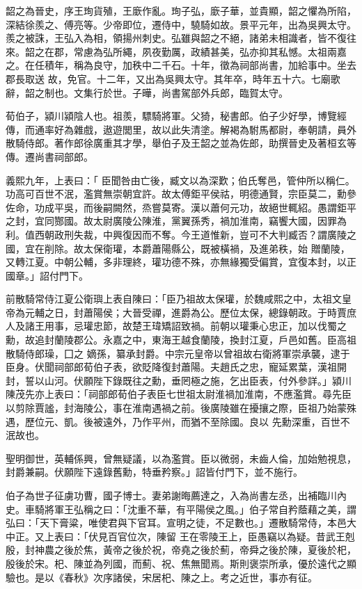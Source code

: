 \begin{pinyinscope}
 韶之為晉史，序王珣貨殖，王廞作亂。珣子弘，廞子華，並貴顯，韶之懼為所陷，深結徐羨之、傅亮等。少帝即位，遷侍中，驍騎如故。景平元年，出為吳興太守。羨之被誅，王弘入為相，領揚州刺史。弘雖與韶之不絕，諸弟未相識者，皆不復往來。韶之在郡，常慮為弘所繩，夙夜勤厲，政績甚美，弘亦抑其私憾。太祖兩嘉之。在任積年，稱為良守，加秩中二千石。十年，徵為祠部尚書，加給事中。坐去郡長取送
 故，免官。十二年，又出為吳興太守。其年卒，時年五十六。七廟歌辭，韶之制也。文集行於世。子曄，尚書駕部外兵郎，臨賀太守。



 荀伯子，潁川潁陰人也。祖羨，驃騎將軍。父猗，秘書郎。伯子少好學，博覽經傳，而通率好為雜戲，遨遊閭里，故以此失清塗。解褐為駙馬都尉，奉朝請，員外散騎侍郎。著作郎徐廣重其才學，舉伯子及王韶之並為佐郎，助撰晉史及著桓玄等傳。遷尚書祠部郎。



 義熙九年，上表曰：「
 臣聞咎由亡後，臧文以為深歎；伯氏奪邑，管仲所以稱仁。功高可百世不泯，濫賞無崇朝宜許。故太傅鉅平侯祜，明德通賢，宗臣莫二，勳參佐命，功成平吳，而後嗣闕然，烝嘗莫寄。漢以蕭何元功，故絕世輒紹。愚謂鉅平之封，宜同酂國。故太尉廣陵公陳淮，黨翼孫秀，禍加淮南，竊饗大國，因罪為利。值西朝政刑失裁，中興復因而不奪。今王道惟新，豈可不大判臧否？謂廣陵之國，宜在削除。故太保衛瓘，本爵蕭陽縣公，既被橫禍，及進弟秩，始
 贈蘭陵，又轉江夏。中朝公輔，多非理終，瓘功德不殊，亦無緣獨受偏賞，宜復本封，以正國章。」詔付門下。



 前散騎常侍江夏公衛璵上表自陳曰：「臣乃祖故太保瓘，於魏咸熙之中，太祖文皇帝為元輔之日，封蕭陽侯；大晉受禪，進爵為公。歷位太保，總錄朝政。于時賈庶人及諸王用事，忌瓘忠節，故楚王瑋矯詔致禍。前朝以瓘秉心忠正，加以伐蜀之勳，故追封蘭陵郡公。永嘉之中，東海王越食蘭陵，換封江夏，戶邑如舊。臣高祖散騎侍郎璪，囗之
 嫡孫，纂承封爵。中宗元皇帝以曾祖故右衛將軍崇承襲，逮于臣身。伏聞祠部郎荀伯子表，欲貶降復封蕭陽。夫趙氏之忠，寵延累葉，漢祖開封，誓以山河。伏願陛下錄既往之勳，垂罔極之施，乞出臣表，付外參詳。」潁川陳茂先亦上表曰：「祠部郎荀伯子表臣七世祖太尉淮禍加淮南，不應濫賞。尋先臣以剪除賈謐，封海陵公，事在淮南遇禍之前。後廣陵雖在擾攘之際，臣祖乃始蒙殊遇，歷位元、凱。後被遠外，乃作平州，而猶不至除國。良以
 先勳深重，百世不泯故也。



 聖明御世，英輔係興，曾無疑議，以為濫賞。臣以微弱，未齒人倫，加始勉視息，封爵兼嗣。伏願陛下遠錄舊勳，特垂矜察。」詔皆付門下，並不施行。



 伯子為世子征虜功曹，國子博士。妻弟謝晦薦達之，入為尚書左丞，出補臨川內史。車騎將軍王弘稱之曰：「沈重不華，有平陽侯之風。」伯子常自矜蔭藉之美，謂弘曰：「天下膏粱，唯使君與下官耳。宣明之徒，不足數也。」遷散騎常侍，本邑大中正。又上表曰：「伏見百官位次，陳留
 王在零陵王上，臣愚竊以為疑。昔武王剋殷，封神農之後於焦，黃帝之後於祝，帝堯之後於薊，帝舜之後於陳，夏後於杞，殷後於宋。杞、陳並為列國，而薊、祝、焦無聞焉。斯則褒崇所承，優於遠代之顯驗也。是以《春秋》次序諸侯，宋居杞、陳之上。考之近世，事亦有征。




\end{pinyinscope}
